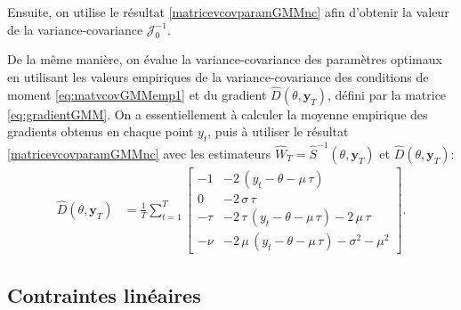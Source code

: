 Ensuite, on utilise le résultat \eqref{matricevcovparamGMMnc} afin
d'obtenir la valeur de la variance-covariance $\mathcal{J}_0^{-1}$.

De la même manière, on évalue la variance-covariance des paramètres
optimaux en utilisant les valeurs empiriques de la variance-covariance
des conditions de moment \eqref{eq:matvcovGMMemp1} et du gradient
$\hat{D}(\theta,\mathbf{y}_T)$, défini par la matrice
\eqref{eq:gradientGMM}. On a essentiellement à calculer la moyenne
empirique des gradients obtenus en chaque point $y_t$, puis à utiliser
le résultat \eqref{matricevcovparamGMMnc} avec les estimateurs
$\hat{W}_T = \hat{S}^{-1}(\theta,\mathbf{y}_T)$ et
$\hat{D}(\theta,\mathbf{y}_T)$:
\begin{align}
  \hat{D}(\theta,\mathbf{y}_T) &= \frac{1}{T} \sum_{t=1}^{T}
  \left[ \begin{array}{cc}
      -1 & -2\,\left( y_t-\theta-\mu\,\tau\right) \\
      0 & -2\,\sigma\,\tau \\
      -\tau & -2\,\tau\,\left( y_t-\theta-\mu\,\tau\right) -2\,\mu\,\tau \\
      -\nu & -2\,\mu\,\left( y_t-\theta-\mu\,\tau\right)
      -{\sigma}^{2}-{\mu}^{2}
    \end{array}\right].
\end{align}

\subsection{Contraintes linéaires}

